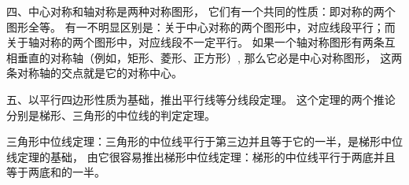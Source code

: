 \jiange
四、中心对称和轴对称是两种对称图形， 它们有一个共同的性质：即对称的两个图形全等。
有一不明显区别是：关于中心对称的两个图形中，对应线段平行；而关于轴对称的两个图形中，对应线段不一定平行。
如果一个轴对称图形有两条互相垂直的对称轴（例如，矩形、菱形、正方形）, 那么它必是中心对称图形，
这两条对称轴的交点就是它的对称中心。


五、以平行四边形性质为基础，推出平行线等分线段定理。
这个定理的两个推论分别是梯形、三角形的中位线的判定定理。

三角形中位线定理：三角形的中位线平行于第三边并且等于它的一半，是梯形中位线定理的基础，
由它很容易推出梯形中位线定理：梯形的中位线平行于两底并且等于两底和的一半。

